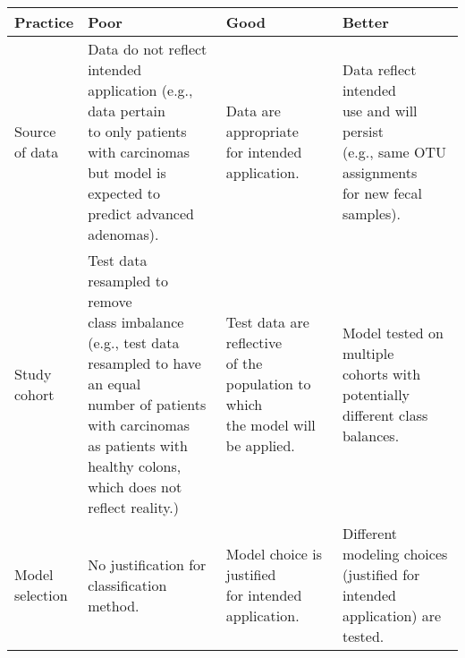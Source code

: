 \documentclass[11pt,]{article}
\author{}
\date{\vspace{-2.5em}}
\begin{document}
\newpage

\captionsetup{labelformat=empty}
\small

\begin{tabular}{|l|l|l|l|}
\hline

\rowcolor{lightgray}
\textbf{Practice} & \textbf{Poor} & \textbf{Good} & \textbf{Better} \\ \hline

\makecell[l]{Source \\ of data} & \makecell[l]{Data do not reflect intended \\  application (e.g., data pertain \\ to only patients with carcinomas \\ but model is expected to \\ predict advanced adenomas).} & \makecell[l]{Data are appropriate \\ for intended application.} & \makecell[l]{Data reflect intended \\ use and will persist \\ (e.g., same OTU assignments \\ for new fecal samples).} \\ \hline

\makecell[l]{Study \\ cohort} & \makecell[l]{Test data resampled to remove \\ class imbalance (e.g., test data \\ resampled to have an equal \\ number of patients with carcinomas \\ as patients with healthy colons, \\ which does not reflect reality.)}  & \makecell[l]{Test data are reflective \\ of the population to which \\ the model will be applied.} & \makecell[l]{Model tested on multiple \\ cohorts with potentially \\ different class balances.} \\ \hline

\makecell[l]{Model \\ selection} & \makecell[l]{No justification for \\ classification method.} & \makecell[l]{Model choice is justified \\ for intended application.} & \makecell[l]{Different modeling choices \\ (justified for intended \\ application) are tested.} \\ \hline


\end{tabular}
\end{document}
